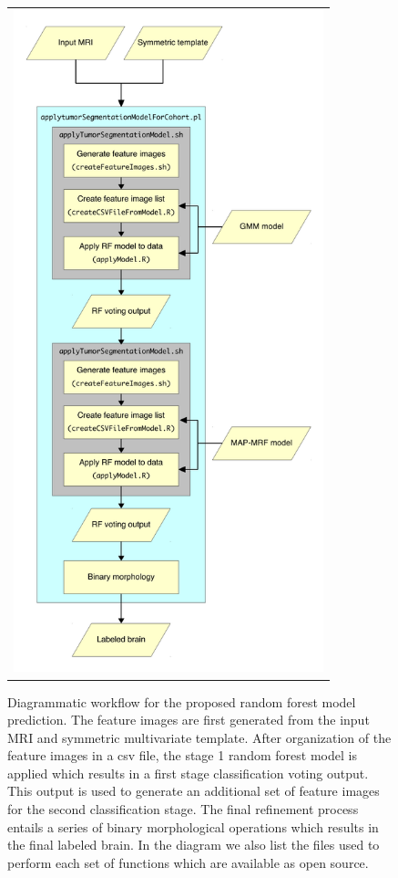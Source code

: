 \documentclass[final,5p,times,twocolumn]{elsarticle}
\begin{document}
\begin{figure}
  \centering
  \begin{tabular}{c}
    \includegraphics[width=90mm]{Figures/pipeline.pdf}
  \end{tabular}
  \caption{Diagrammatic workflow for the proposed random forest model prediction.  The feature
  images are first generated from the input MRI and symmetric multivariate template. 
  After organization of the feature images in a csv file, the stage 1 random forest model is 
  applied which results in a first stage classification voting output.  This output
  is used to generate an additional set of feature images for the second classification
  stage.  The final refinement process entails a series of binary morphological 
  operations which results in the final labeled brain.  In the diagram we also list
  the files used to perform each set of functions which are available as open source.
  }
  \label{fig:pipeline}
\end{figure}
\end{document}
